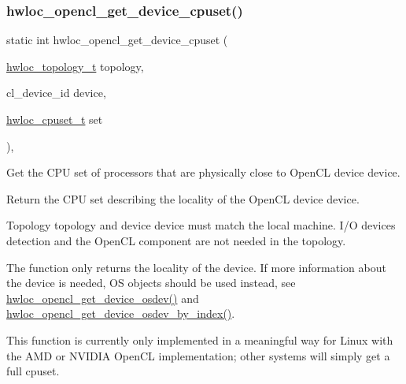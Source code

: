 \subsubsection{\texorpdfstring{hwloc\+\_\+opencl\+\_\+get\+\_\+device\+\_\+cpuset()}{hwloc\_opencl\_get\_device\_cpuset()}}
{\footnotesize\ttfamily static int hwloc\+\_\+opencl\+\_\+get\+\_\+device\+\_\+cpuset (\begin{DoxyParamCaption}\item[{\hyperlink{a00186_ga9d1e76ee15a7dee158b786c30b6a6e38}{hwloc\+\_\+topology\+\_\+t}}]{topology,  }\item[{cl\+\_\+device\+\_\+id}]{device,  }\item[{\hyperlink{a00183_ga4bbf39b68b6f568fb92739e7c0ea7801}{hwloc\+\_\+cpuset\+\_\+t}}]{set }\end{DoxyParamCaption})\hspace{0.3cm}{\ttfamily [inline]}, {\ttfamily [static]}}



Get the C\+PU set of processors that are physically close to Open\+CL device {\ttfamily device}. 

Return the C\+PU set describing the locality of the Open\+CL device {\ttfamily device}.

Topology {\ttfamily topology} and device {\ttfamily device} must match the local machine. I/O devices detection and the Open\+CL component are not needed in the topology.

The function only returns the locality of the device. If more information about the device is needed, OS objects should be used instead, see \hyperlink{a00218_gadabfa6516aa12e5d8f79b9b4dd9f3cf8}{hwloc\+\_\+opencl\+\_\+get\+\_\+device\+\_\+osdev()} and \hyperlink{a00218_gae39352d124cb330eb37b84b418ed6cc5}{hwloc\+\_\+opencl\+\_\+get\+\_\+device\+\_\+osdev\+\_\+by\+\_\+index()}.

This function is currently only implemented in a meaningful way for Linux with the A\+MD or N\+V\+I\+D\+IA Open\+CL implementation; other systems will simply get a full cpuset. \mbox{\label{a00218_gadabfa6516aa12e5d8f79b9b4dd9f3cf8}} 

